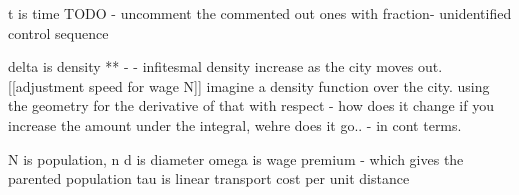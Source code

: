

%  


t is time
TODO - uncomment the commented out ones with fraction- unidentified control sequence

delta is density ** - - infitesmal density increase as the city moves out. [[adjustment speed for wage N]] imagine a density function over the city. 
using the geometry for the derivative of that with respect - how does it change if you increase the amount under the integral, wehre does it go..  - in cont terms.  

N is population, n
d is diameter %
omega is wage premium - which gives  the parented population
tau is linear transport cost per unit distance



